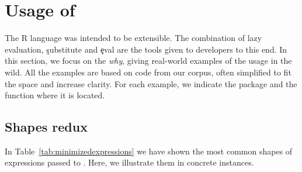 \documentclass[review,screen,acmsmall]{acmart}
\begin{document}
\section{Usage of \eval}

The R language was intended to be extensible. The combination of lazy
evaluation, \c{substitute} and \c{eval} are the tools given to developers to
this end. In this section, we focus on the \emph{why}, giving real-world
examples of the \eval usage in the wild. All the examples are based on code from
our corpus, often simplified to fit the space and increase clarity. For each
example, we indicate the package and the function where it is located.

\subsection{Shapes redux}

In Table~\ref{tab:minimizedexpressions} we have shown the most common shapes of
expressions passed to \eval. Here, we illustrate them in concrete instances.
\end{document}
